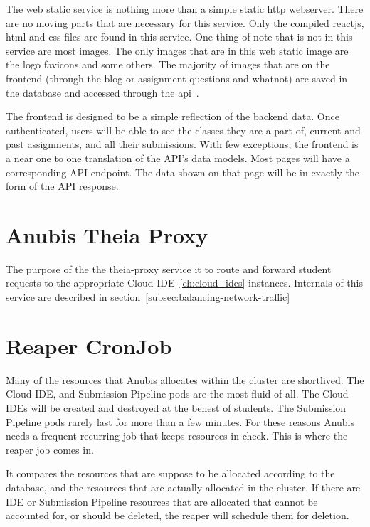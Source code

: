 The web static service is nothing more than a simple static http webserver.
There are no moving parts that are necessary for this service.
Only the compiled reactjs, html and css files are found in this service.
One thing of note that is not in this service are most images.
The only images that are in this web static image are the logo favicons
and some others.
The majority of images that are on the frontend (through the blog or assignment questions and whatnot)
are saved in the database and accessed through the api~.

The frontend is designed to be a simple reflection of the backend data.
Once authenticated, users will be able to see the classes they are a part of,
current and past assignments, and all their submissions.
With few exceptions, the frontend is a near one to one translation of the API's data models.
Most pages will have a corresponding API endpoint.
The data shown on that page will be in exactly the form of the API response.


\section{Anubis Theia Proxy}\label{sec:theia-proxy}

The purpose of the the theia-proxy service it to route and forward student requests
to the appropriate Cloud IDE~\ref{ch:cloud_ides} instances.
Internals of this service are described in section~\ref{subsec:balancing-network-traffic}

\section{Reaper CronJob}\label{sec:reaper}

Many of the resources that Anubis allocates within the cluster are shortlived. The Cloud IDE, and Submission Pipeline
pods are the most fluid of all.
The Cloud IDEs will be created and destroyed at the behest of students.
The Submission Pipeline pods rarely last for more than a few minutes. 
For these reasons Anubis needs a frequent recurring job that keeps resources in check.
This is where the reaper job comes in. 

It compares the resources that are suppose to be allocated according to 
the database, and the resources that are actually allocated in the cluster. 
If there are IDE or Submission Pipeline resources that are allocated that 
cannot be accounted for, or should be deleted, the reaper will schedule
them for deletion.

